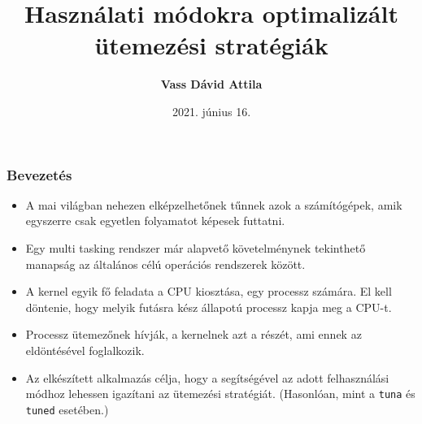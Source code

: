 \documentclass{beamer}
\title[Használati módokra optimalizált ütemezési stratégiák]{Használati módokra optimalizált \\ ütemezési stratégiák}
\author[Vass Dávid Attila]{\textbf{Vass Dávid Attila}}
\institute[]{Miskolci Egyetem, Alkalmazott Matematikai Intézeti Tanszék}
\date{2021. június 16.}
\begin{document}
\begin{frame}
\maketitle
\end{frame}

\begin{frame}
\frametitle{Bevezetés}
\begin{itemize}

\item A mai világban nehezen elképzelhetőnek tűnnek azok a számítógépek, amik egyszerre csak egyetlen folyamatot képesek futtatni.
\item Egy multi tasking rendszer már alapvető követelménynek tekinthető manapság az általános célú operációs rendszerek között. 
\item A kernel egyik fő feladata a CPU kiosztása, egy processz számára. El kell döntenie, hogy melyik futásra kész állapotú processz kapja meg a CPU-t.
\item Processz ütemezőnek hívják, a kernelnek azt a részét, ami ennek az eldöntésével foglalkozik.
\item Az elkészített alkalmazás célja, hogy a segítségével az adott felhasználási módhoz lehessen igazítani az ütemezési stratégiát. (Hasonlóan, mint a \texttt{tuna} és \texttt{tuned} esetében.)
\end{itemize}
\end{frame}
\end{document}
